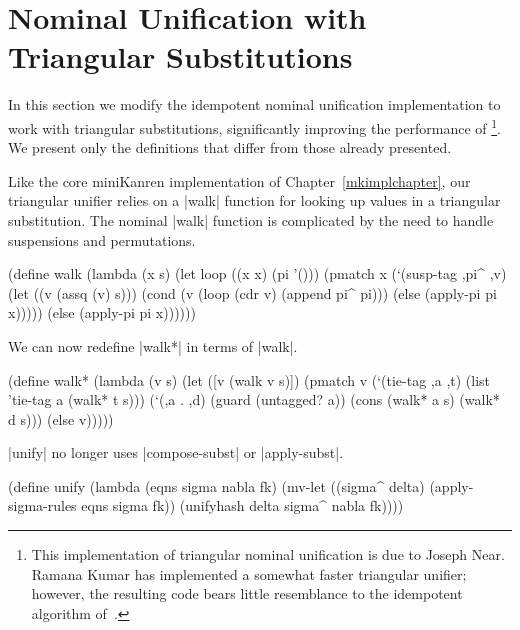 \section{Nominal Unification with Triangular Substitutions}\label{triangularsection}

\enlargethispage{1em}

In this section we modify the idempotent nominal unification
implementation to work with triangular substitutions, significantly
improving the performance of \alphakanren\footnote{This implementation
  of triangular nominal unification is due to Joseph Near.  Ramana
  Kumar has implemented a somewhat faster triangular unifier; however,
  the resulting code bears little resemblance to the idempotent
  algorithm of~\cite{Urban-Pitts-Gabbay/04}.}.  We present only the
definitions that differ from those already presented.

Like the core miniKanren implementation of
Chapter~\ref{mkimplchapter}, our triangular unifier relies on a
\scheme|walk| function for looking up values in a triangular
substitution.  The nominal \scheme|walk| function is complicated by
the need to handle suspensions and permutations.

\schemedisplayspace
\begin{schemedisplay}
(define walk
  (lambda (x s)
    (let loop ((x x) (pi '()))
      (pmatch x
        (`(susp-tag ,pi^ ,v)
         (let ((v (assq (v) s)))
           (cond
             (v (loop (cdr v) (append pi^ pi)))
             (else (apply-pi pi x)))))
        (else (apply-pi pi x))))))
\end{schemedisplay}

We can now redefine \scheme|walk*| in terms of \scheme|walk|.

\schemedisplayspace
\begin{schemedisplay}
(define walk*
  (lambda (v s)
    (let ([v (walk v s)])
      (pmatch v
        (`(tie-tag ,a ,t) (list 'tie-tag a (walk* t s)))
        (`(,a . ,d) (guard (untagged? a))
         (cons (walk* a s) (walk* d s)))
        (else v)))))
\end{schemedisplay}

\scheme|unify| no longer uses \scheme|compose-subst| or
\scheme|apply-subst|.

\schemedisplayspace
\begin{schemedisplay}
(define unify
  (lambda (eqns sigma nabla fk)
    (mv-let ((sigma^ delta) (apply-sigma-rules eqns sigma fk))
      (unifyhash delta sigma^ nabla fk))))
\end{schemedisplay}

